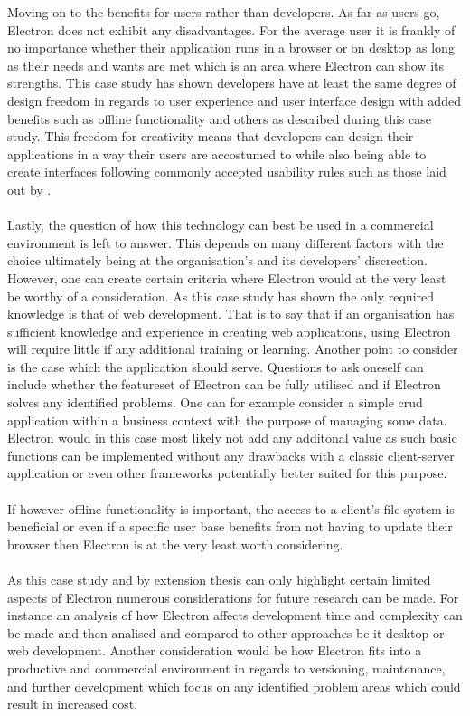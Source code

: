 Moving on to the benefits for users rather than developers.
As far as users go, Electron does not exhibit any disadvantages. 
For the average user it is frankly of no importance whether their application
runs in a browser or on desktop as long as their needs and wants are met which
is an area where Electron can show its strengths. 
This case study has shown developers have at least the same degree of 
design freedom in regards to user experience and user interface design 
with added benefits such as offline functionality and others as described
during this case study. 
This freedom for creativity means that developers can design their applications
in a way their users are accostumed to while also being able to create
interfaces following commonly accepted usability rules such as those
laid out by \textcite{usabilityHeuristics}.\paragraph{}
Lastly, the question of how this technology can best be used in 
a commercial environment is left to answer.
This depends on many different factors with the choice 
ultimately being at the organisation's and its 
developers' discrection. 
However, one can create certain criteria where Electron would at the 
very least be worthy of a consideration. 
As this case study has shown the only required knowledge is that 
of web development. 
That is to say that if an organisation has sufficient knowledge and 
experience in creating web applications, using Electron will require 
little if any additional training or learning. 
Another point to consider is the case which the application should serve.
Questions to ask oneself can include whether the featureset of Electron 
can be fully utilised and if Electron solves any identified problems. 
One can for example consider a simple \acrfull{crud} application within 
a business context with the purpose of managing some data. 
Electron would in this case most likely not add any additonal value 
as such basic functions can be implemented without any drawbacks with 
a classic client-server application or even other frameworks potentially better
suited for this purpose.\paragraph{}
If however offline functionality is important, the access to a client's file 
system is beneficial or even if a specific user base benefits from not having
to update their browser then Electron is at the very least worth considering.\paragraph{}
As this case study and by extension thesis can only highlight certain limited 
aspects of Electron numerous considerations for future research can be made. 
For instance an analysis of how Electron affects development time and complexity 
can be made and then analised and compared to other approaches be it desktop
or web development.
Another consideration would be how Electron fits into a productive and 
commercial environment in regards to versioning, maintenance, and further development 
which focus on any identified problem areas which could result in increased cost. 
